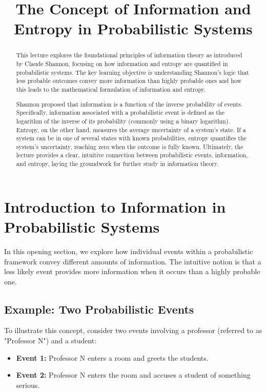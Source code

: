 \documentclass[12pt,a4paper]{article}
\title{The Concept of Information and Entropy in Probabilistic Systems}
\begin{document}
\maketitle
\begin{abstract}This lecture explores the foundational principles of information theory as introduced by Claude Shannon, focusing on how information and entropy are quantified in probabilistic systems. The key learning objective is understanding Shannon’s logic that less probable outcomes convey more information than highly probable ones and how this leads to the mathematical formulation of information and entropy.

Shannon proposed that information is a function of the inverse probability of events. Specifically, information associated with a probabilistic event is defined as the logarithm of the inverse of its probability (commonly using a binary logarithm). Entropy, on the other hand, measures the average uncertainty of a system’s state. If a system can be in one of several states with known probabilities, entropy quantifies the system’s uncertainty, reaching zero when the outcome is fully known. Ultimately, the lecture provides a clear, intuitive connection between probabilistic events, information, and entropy, laying the groundwork for further study in information theory.\end{abstract}

\section{Introduction to Information in Probabilistic Systems}
In this opening section, we explore how individual events within a probabilistic framework convey different amounts of information. The intuitive notion is that a less likely event provides more information when it occurs than a highly probable one.

\subsection{Example: Two Probabilistic Events}
To illustrate this concept, consider two events involving a professor (referred to as "Professor N") and a student:

\begin{itemize}
    \item \textbf{Event 1:} Professor N enters a room and greets the students.
    \item \textbf{Event 2:} Professor N enters the room and accuses a student of something serious.
\end{itemize}
\end{document}
